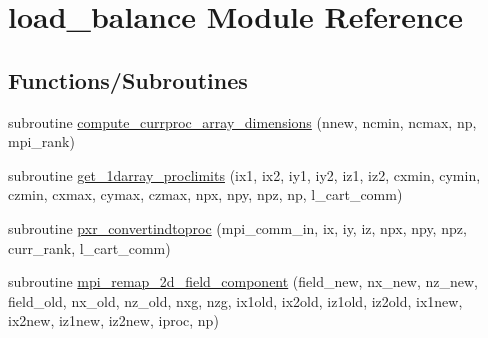 \hypertarget{namespaceload__balance}{}\section{load\+\_\+balance Module Reference}
\label{namespaceload__balance}
\subsection*{Functions/\+Subroutines}
\begin{DoxyCompactItemize}
\item 
subroutine \hyperlink{namespaceload__balance_a01de34e5200e19001ef6a0819fc73ab9}{compute\+\_\+currproc\+\_\+array\+\_\+dimensions} (nnew, ncmin, ncmax, np, mpi\+\_\+rank)
\item 
subroutine \hyperlink{namespaceload__balance_a23f2ec36e02070edb8645281e4de7a11}{get\+\_\+1darray\+\_\+proclimits} (ix1, ix2, iy1, iy2, iz1, iz2, cxmin, cymin, czmin,                                                                                                                                           cxmax, cymax, czmax, npx, npy, npz, np, l\+\_\+cart\+\_\+comm)
\item 
subroutine \hyperlink{namespaceload__balance_a956f41bdb759ed748f8e75fd86a18d59}{pxr\+\_\+convertindtoproc} (mpi\+\_\+comm\+\_\+in, ix, iy, iz, npx, npy, npz, curr\+\_\+rank, l\+\_\+cart\+\_\+comm)
\item 
subroutine \hyperlink{namespaceload__balance_ae5489890ffdc28631b9c4f895a84396c}{mpi\+\_\+remap\+\_\+2d\+\_\+field\+\_\+component} (field\+\_\+new, nx\+\_\+new, nz\+\_\+new,                                                                                                                                                                                       field\+\_\+old, nx\+\_\+old, nz\+\_\+old,                                                                                                                                                                                       nxg, nzg,                                                                                                                                                                                                                                                       ix1old, ix2old, iz1old, iz2old,                                                                                                                                                           ix1new, ix2new, iz1new, iz2new,                                                                                                                                                           iproc, np)

\end{DoxyCompactItemize}
